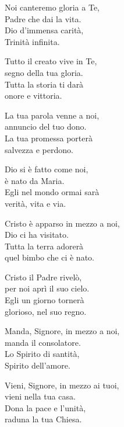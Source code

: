 
\strofa Noi canteremo gloria a Te,\\
Padre che dai la vita.\\
Dio d'immensa carità,\\
Trinità infinita.

\spazio

\strofa Tutto il creato vive in Te,\\
segno della tua gloria.\\
Tutta la storia ti darà\\
onore e vittoria.

\spazio

\strofa La tua parola venne a noi,\\
 annuncio del tuo dono.\\
La tua promessa porterà\\
salvezza e perdono.

\spazio

\strofa Dio si è fatto come noi,\\
è nato da Maria.\\
Egli nel mondo ormai sarà\\
verità, vita e via.

\spazio

\strofa Cristo è apparso in mezzo a noi,\\
Dio ci ha visitato.\\
Tutta la terra adorerà\\
quel bimbo che ci è nato.

\spazio

\strofa Cristo il Padre rivelò,\\
per noi aprì il suo cielo.\\
Egli un giorno tornerà\\
glorioso, nel suo regno.

\spazio

\strofa Manda, Signore, in mezzo a noi,\\
manda il consolatore.\\
Lo Spirito di santità,\\
Spirito dell'amore.

\spazio

\strofa Vieni, Signore, in mezzo ai tuoi,\\
vieni nella tua casa.\\
Dona la pace e l'unità,\\
raduna la tua Chiesa.
